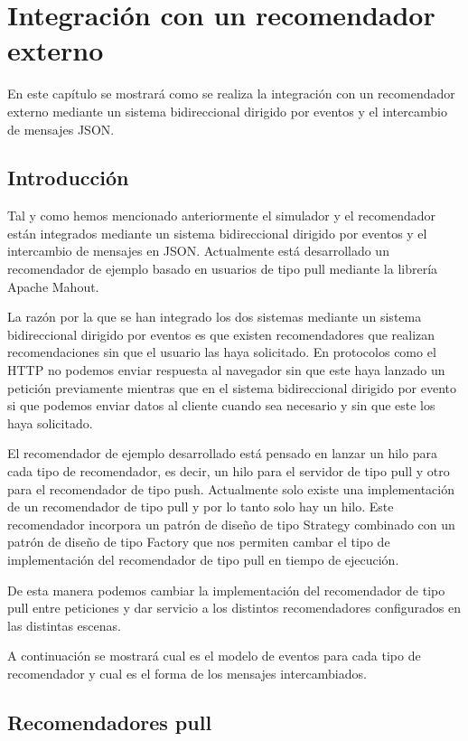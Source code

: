 \chapter{Integración con un recomendador externo}

En este capítulo se mostrará como se realiza la integración con un recomendador externo mediante un sistema bidireccional dirigido por eventos y el intercambio de mensajes JSON.

\section{Introducción}

Tal y como hemos mencionado anteriormente el simulador y el recomendador están integrados mediante un sistema bidireccional dirigido por eventos y el intercambio de mensajes en JSON. Actualmente está desarrollado un recomendador de ejemplo basado en usuarios de tipo pull mediante la librería Apache Mahout. 

La razón por la que se han integrado los dos sistemas mediante un sistema bidireccional dirigido por eventos es que existen recomendadores que realizan recomendaciones sin que el usuario las haya solicitado. En protocolos como el HTTP no podemos enviar respuesta al navegador sin que este haya lanzado un petición previamente mientras que en el sistema bidireccional dirigido por evento si que podemos enviar datos al cliente cuando sea necesario y sin que este los haya solicitado. 

El recomendador de ejemplo desarrollado está pensado en lanzar un hilo para cada tipo de recomendador, es decir, un hilo para el servidor de tipo pull y otro para el recomendador de tipo push. Actualmente solo existe una implementación de un recomendador de tipo pull y por lo tanto solo hay un hilo. Este recomendador incorpora un patrón de diseño de tipo Strategy combinado con un patrón de diseño de tipo Factory que nos permiten cambar el tipo de implementación del recomendador de tipo pull en tiempo de ejecución. 

De esta manera podemos cambiar la implementación del recomendador de tipo pull entre peticiones y dar servicio a los distintos recomendadores configurados en las distintas escenas. 

A continuación se mostrará cual es el modelo de eventos para cada tipo de recomendador y cual es el forma de los mensajes intercambiados. 

\section{Recomendadores pull}

